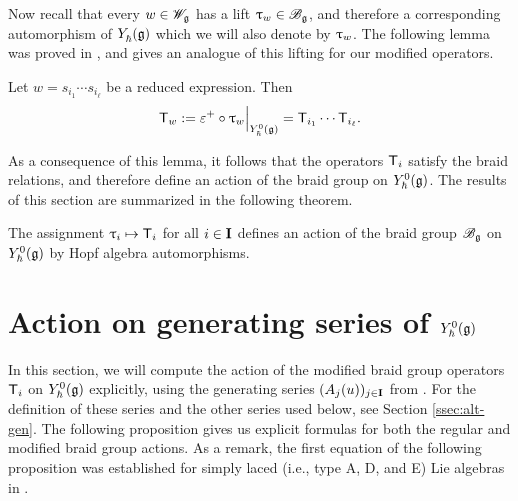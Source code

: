 Now recall that every $w\in\Wg$ has a lift $\braid_w\in\Bg$, and therefore a corresponding automorphism of $\Yhg$ which we will also denote by $\braid_w$.
The following lemma was proved in \cite[Thm. 5.3.19]{weekes_highest_2016}, and gives an analogue of this lifting for our modified operators.

\begin{lemma}\label{L:Tw}
    Let $w=s_{i_1}\cdots s_{i_\ell}$ be a reduced expression. Then
    \[\mbraid_w := \varepsilon^+\circ\braid_w\Big|_{\Yhg[0]} = \mbraid_{i_1}\cdots\mbraid_{i_\ell}.\]
\end{lemma}

As a consequence of this lemma, it follows that the operators $\mbraid_i$ satisfy the braid relations, and therefore define an action of the braid group on $\Yhg[0]$.
The results of this section are summarized in the following theorem.

\begin{theorem}\label{T:mbraid-action}
    The assignment $\braid_i\mapsto\mbraid_i$ for all $i\in\I$ defines an action of the braid group $\Bg$ on $\Yhg[0]$ by Hopf algebra automorphisms.
\end{theorem}


\section{Action on generating series of \texorpdfstring{$\Yhg[0]$}{Y0}}

In this section, we will compute the action of the modified braid group operators $\mbraid_i$ on $\Yhg[0]$ explicitly, using the generating series $(A_j(u))_{j\in\I}$ from \cite{gerasimov_class_2005}.
For the definition of these series and the other series used below, see Section \ref{ssec:alt-gen}.
The following proposition gives us explicit formulas for both the regular and modified braid group actions.
As a remark, the first equation of the following proposition was established for simply laced (i.e., type A, D, and E) Lie algebras in \cite[Lem. 5.3.16]{weekes_highest_2016}.

